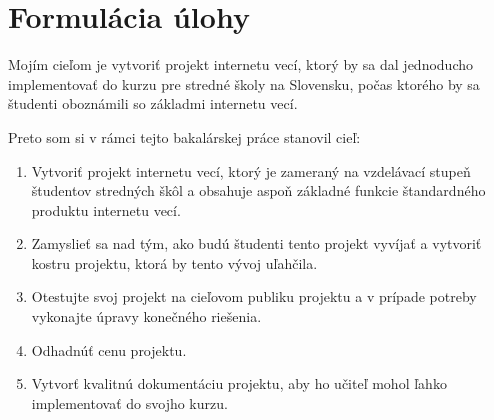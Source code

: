 \section*{Formulácia úlohy}
Mojím cieľom je vytvoriť projekt internetu vecí, ktorý by sa dal jednoducho implementovať do kurzu pre stredné školy na Slovensku, počas ktorého by sa študenti oboznámili so základmi internetu vecí. 

Preto som si v rámci tejto bakalárskej práce stanovil cieľ:
\begin{enumerate}
    \item Vytvoriť projekt internetu vecí, ktorý je zameraný na vzdelávací stupeň študentov stredných škôl a obsahuje aspoň základné funkcie štandardného produktu internetu vecí.
    \item Zamyslieť sa nad tým, ako budú študenti tento projekt vyvíjať a vytvoriť kostru projektu, ktorá by tento vývoj uľahčila.
    \item Otestujte svoj projekt na cieľovom publiku projektu a v prípade potreby vykonajte úpravy konečného riešenia.
    \item Odhadnúť cenu projektu.
    \item Vytvorť kvalitnú dokumentáciu projektu, aby ho učiteľ mohol ľahko implementovať do svojho kurzu.
\end{enumerate}
